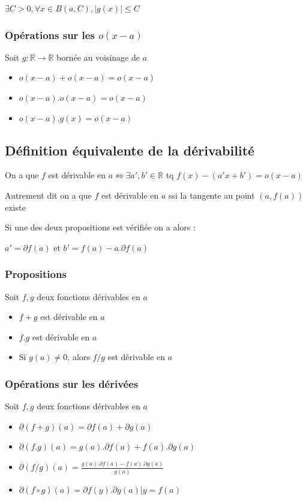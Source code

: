 \documentclass[a4paper,10pt]{article}
\newcommand{\ap}{\rightarrow}
\newcommand{\R}{\mathbb{R}}
\newcommand{\ioi}{\Leftrightarrow}
\newcommand{\abs}[1]{\left\vert #1 \right\vert}
\begin{document}
$\exists C > 0, \forall x \in B(a,C), \abs{g(x)} \leq C$


\subsubsection{Opérations sur les $o(x-a)$}

Soit $g : \R \ap \R$ bornée au voisinage de $a$

\begin{itemize}
	\item{$o(x-a)+o(x-a)=o(x-a)$}
        \item{$o(x-a).o(x-a) = o(x-a)$}
        \item{$o(x-a).g(x) = o(x-a)$}
\end{itemize}

\subsection{Définition équivalente de la dérivabilité}

On a que $f$ est dérivable en $a \ioi \exists a', b' \in \R$ tq $f(x) - (a'x + b') = o(x-a)$

Autrement dit on a que $f$ est dérivable en $a$ ssi la tangente au point $(a,f(a))$ existe

Si une des deux propositions est vérifiée on a alors :

$a' = \partial f(a)$ et $b' = f(a)-a.\partial f(a)$

\subsubsection{Propositions}

Soit $f,g$ deux fonctions dérivables en $a$

\begin{itemize}
	\item{$f+g$ est dérivable en $a$}
	\item{$f.g$ est dérivable en $a$}
	\item{Si $g(a) \neq 0$, alors $f/g$ est dérivable en $a$}
\end{itemize}

\subsubsection{Opérations sur les dérivées}

Soit $f,g$ deux fonctions dérivables en $a$

\begin{itemize}
	\item{$\partial(f+g)(a) = \partial f(a) + \partial g(a)$}
	\item{$\partial(f.g)(a) = g(a).\partial f(a) + f(a).\partial g(a)$}
	\item{$\partial(f/g)(a) = \frac{g(a).\partial f(a) - f(a).\partial g(a)}{g(a)}$}
	\item{$\partial(f \circ g)(a) = \partial f(y) . \partial g(a) \vert y = f(a)$}
\end{itemize}
\end{document}
